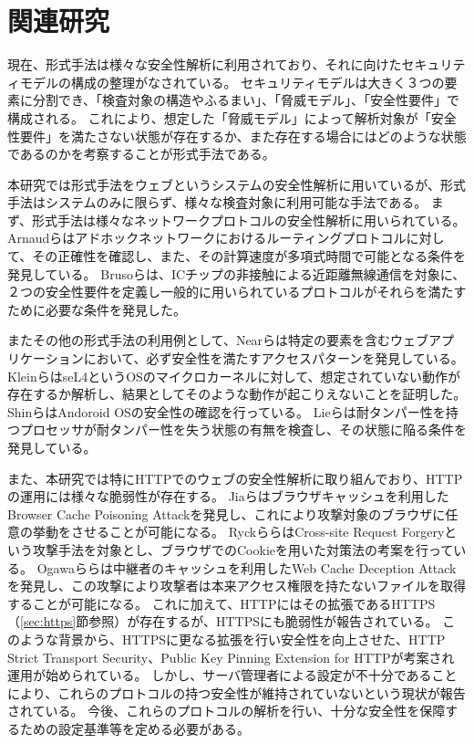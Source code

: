 \documentclass[12pt,a4paper]{jbook}
\begin{document}
\section{関連研究}
現在、形式手法は様々な安全性解析に利用されており、それに向けたセキュリティモデルの構成の整理がなされている\cite{security_modeling_and_analysis}。
セキュリティモデルは大きく３つの要素に分割でき、「検査対象の構造やふるまい」、「脅威モデル」、「安全性要件」で構成される。
これにより、想定した「脅威モデル」によって解析対象が「安全性要件」を満たさない状態が存在するか、また存在する場合にはどのような状態であるのかを考察することが形式手法である。


本研究では形式手法をウェブというシステムの安全性解析に用いているが、形式手法はシステムのみに限らず、様々な検査対象に利用可能な手法である。
まず、形式手法は様々なネットワークプロトコルの安全性解析に用いられている。
Arnaudら\cite{modeling-and-verifying-ad-hoc}はアドホックネットワークにおけるルーティングプロトコルに対して、その正確性を確認し、また、その計算速度が多項式時間で可能となる条件を発見している。
Brusoら\cite{formal-verification-of-privacy-for}は、ICチップの非接触による近距離無線通信\cite{formal-verification-of-privacy-for}を対象に、２つの安全性要件を定義し一般的に用いられているプロトコルがそれらを満たすために必要な条件を発見した。

またその他の形式手法の利用例として、Nearら\cite{finding_security_bugs_in_web}は特定の要素を含むウェブアプリケーションにおいて、必ず安全性を満たすアクセスパターンを発見している。
Kleinら\cite{sel4_formal_verification_of_an}はseL4というOSのマイクロカーネルに対して、想定されていない動作が存在するか解析し、結果としてそのような動作が起こりえないことを証明した。
Shinら\cite{towards_formal_analysis_of_the}はAndoroid OSの安全性の確認を行っている。
Lieら\cite{specifying_and_verifying_hardware_for_tamper}は耐タンパー性を持つプロセッサが耐タンパー性を失う状態の有無を検査し、その状態に陥る条件を発見している。

また、本研究では特にHTTPでのウェブの安全性解析に取り組んでおり、HTTPの運用には様々な脆弱性が存在する。
Jiaら\cite{bcpattack}はブラウザキャッシュを利用したBrowser Cache Poisoning Attackを発見し、これにより攻撃対象のブラウザに任意の挙動をさせることが可能になる。
Ryckら\cite{cookie-model}らはCross-site Request Forgeryという攻撃手法を対象とし、ブラウザでのCookieを用いた対策法の考案を行っている。
Ogawaら\cite{WCD}らは中継者のキャッシュを利用したWeb Cache Deception Attackを発見し、この攻撃により攻撃者は本来アクセス権限を持たないファイルを取得することが可能になる。
これに加えて、HTTPにはその拡張であるHTTPS（\ref{sec:https}節参照）が存在するが、HTTPSにも脆弱性が報告されている\cite{poodle}。
このような背景から、HTTPSに更なる拡張を行い安全性を向上させた、HTTP Strict Transport Security\cite{hsts}、Public Key Pinning Extension for HTTP\cite{hpkp}が考案され運用が始められている。
しかし、サーバ管理者による設定が不十分であることにより、これらのプロトコルの持つ安全性が維持されていないという現状が報告されている\cite{hstshpkp}。
今後、これらのプロトコルの解析を行い、十分な安全性を保障するための設定基準等を定める必要がある。
\end{document}
